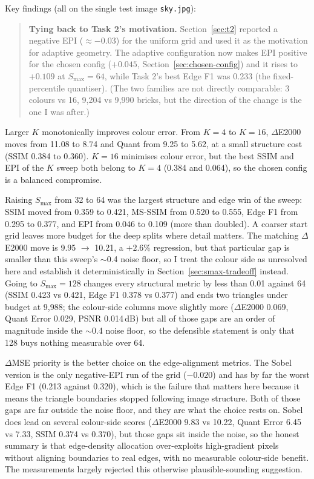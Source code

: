 \documentclass[11pt,a4paper]{article}
\begin{document}
Key findings (all on the single test image \texttt{sky.jpg}):

\begin{quote}
\textbf{Tying back to Task 2's motivation.} Section~\ref{sec:t2} reported a
negative EPI ($\approx -0.03$) for the uniform grid and used it as the
motivation for adaptive geometry. The adaptive configuration now makes EPI
positive for the chosen config ($+0.045$, Section~\ref{sec:chosen-config}) and
it rises to $+0.109$ at $S_{\max}=64$, while Task 2's best Edge F1 was 0.233
(the fixed-percentile quantiser). (The two families are not directly
comparable: 3 colours vs 16, 9{,}204 vs 9{,}990 bricks, but the direction of
the change is the one I was after.)
\end{quote}

Larger $K$ monotonically improves colour error. From $K=4$ to $K=16$,
$\Delta$E2000 moves from 11.08 to 8.74 and Quant from 9.25 to 5.62, at a small
structure cost (SSIM 0.384 to 0.360). \textbf{$K=16$} minimises colour error, but
the best SSIM and EPI of the $K$ sweep both belong to $K=4$ (0.384 and 0.064),
so the chosen config is a balanced compromise.

Raising $S_{\max}$ from 32 to 64 was the largest structure and edge win of the
sweep: SSIM moved from 0.359 to 0.421, MS-SSIM from 0.520 to 0.555, Edge F1 from
0.295 to 0.377, and EPI from 0.046 to 0.109 (more than doubled). A coarser start
grid leaves more budget for the deep splits where detail matters. The matching
$\Delta$E2000 move is 9.95 $\rightarrow$ 10.21, a $+2.6\%$ regression, but that
particular gap is smaller than this sweep's $\sim$0.4 noise floor, so I treat the
colour side as unresolved here and establish it deterministically in
Section~\ref{sec:smax-tradeoff} instead. Going to $S_{\max}=128$ changes every
structural metric by less than 0.01 against 64 (SSIM 0.423 vs 0.421, Edge F1
0.378 vs 0.377) and ends two triangles under budget at 9{,}988; the colour-side
columns move slightly more ($\Delta$E2000 0.069, Quant Error 0.029, PSNR
0.014\,dB) but all of those gaps are an order of magnitude inside the $\sim$0.4
noise floor, so the defensible statement is only that 128 buys nothing
measurable over 64.

$\Delta$MSE priority is the better choice on the edge-alignment metrics. The
Sobel version is the only negative-EPI run of the grid ($-0.020$) and has by far
the worst Edge F1 (0.213 against 0.320), which is the failure that matters here
because it means the triangle boundaries stopped following image structure. Both
of those gaps are far outside the noise floor, and they are what the choice
rests on. Sobel does lead on several colour-side scores ($\Delta$E2000 9.83 vs
10.22, Quant Error 6.45 vs 7.33, SSIM 0.374 vs 0.370), but those gaps sit inside
the noise, so the honest summary is that edge-density allocation over-exploits
high-gradient pixels without aligning boundaries to real edges, with no
measurable colour-side benefit. The measurements largely rejected this otherwise
plausible-sounding suggestion.
\end{document}
